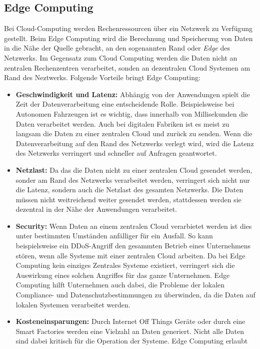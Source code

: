 \documentclass[runningheads]{llncs}
\numberwithin{figure}{section}
\begin{document}
\subsection{Edge Computing}
\label{sub:Edge Computing}
Bei Cloud-Computing werden Rechenressourcen über ein Netzwerk zu Verfügung gestellt.
Beim Edge Computing wird die Berechnung und Speicherung von Daten in die Nähe der Quelle gebracht,
an den sogenannten Rand oder \textit{Edge} des Netzwerks. Im Gegensatz zum Cloud Computing werden die Daten
nicht an zentralen Rechenzentren verarbeitet, sonden an dezentralen Cloud Systemen am Rand des Neztwerks. 
Folgende Vorteile bringt Edge Computing: \cite{labrieTopBenefitsEdge}
\begin{itemize}
  \item \textbf{Geschwindigkeit und Latenz:} Abhängig von der Anwendungen spielt die Zeit der Datenverarbeitung eine
  entscheidende Rolle. Beispielsweise bei Autonomen Fahrzeugen ist es wichtig, dass innerhalb von Millisekunden die Daten
  verarbeitet werden. Auch bei digitalen Fabriken ist es meist zu langsam die Daten zu einer zentralen Cloud und zurück
  zu senden. 
  Wenn die Datenverarbeitung auf den Rand des Netzwerks verlegt wird, wird die Latenz des Netzwerks verringert und schneller
  auf Anfragen geantwortet.
  \item \textbf{Netzlast:} Da das die Daten nicht zu einer zentralen Cloud gesendet werden, sonder am Rand des Netzwerks 
  verarbeitet werden, verringert sich nicht nur die Latenz, sondern auch die Netzlast des gesamten Netzwerks. 
  Die Daten müssen nicht weitreichend weiter gesendet werden, stattdessen werden sie 
  dezentral in der Nähe der Anwendungen verarbeitet.
  \item \textbf{Security:} Wenn Daten an einem zentralen Cloud verarbietet werden ist dies unter bestimmten Umständen anfälliger
  für ein Ausfall.
  So kann beispielsweise ein DDoS-Angriff den gesammten Betrieb eines Unternehmens stören, wenn alle Systeme mit einer zentralen
  Cloud arbeiten. Da bei Edge Computing kein einziges Zentrales Systeme existiert, verringert sich die Auswirkung eines solchen
  Angriffes für das ganze Unternehmen.  
  Edge Computing hilft Unternehmen auch dabei, die Probleme der lokalen Compliance- und Datenschutzbestimmungen zu überwinden,
  da die Daten auf lokalen Systemen verarbeitet werden.
  \item \textbf{Kosteneinsparungen:} Durch Internet Off Things Geräte oder durch eine Smart Factories werden
  eine Vielzahl an Daten generiert. Nicht alle Daten sind dabei kritisch für die Operation der Systeme. Edge Computing erlaubt

\end{itemize}
\end{document}
